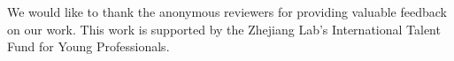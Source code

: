 \documentclass[sigconf, anonymous]{acmart}
\begin{document}



\appendix





\begin{acks}
We would like to thank the anonymous reviewers for providing valuable feedback on our work. This work is supported by the Zhejiang Lab’s International Talent Fund for Young Professionals.
\end{acks}


\vspace{-0.04in}
% 


\end{document}
